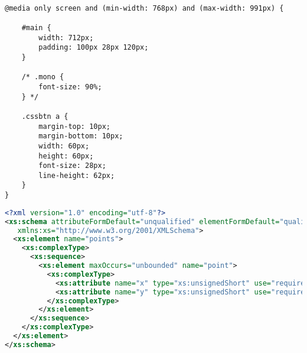 \documentclass[a4paper,15pt]{article}
\begin{document}
\begin{lstlisting}[style=htmlcssjsStyle]

@media only screen and (min-width: 768px) and (max-width: 991px) {
	
	#main {
		width: 712px;
		padding: 100px 28px 120px;
	}
	
	/* .mono {
		font-size: 90%;
	} */
	
	.cssbtn a {
		margin-top: 10px;
		margin-bottom: 10px;
		width: 60px;  
		height: 60px;   
		font-size: 28px;
		line-height: 62px;
	}
}
\end{lstlisting}

\begin{lstlisting}[language=XML]
<?xml version="1.0" encoding="utf-8"?>
<xs:schema attributeFormDefault="unqualified" elementFormDefault="qualified"
   xmlns:xs="http://www.w3.org/2001/XMLSchema">
  <xs:element name="points">
    <xs:complexType>
      <xs:sequence>
        <xs:element maxOccurs="unbounded" name="point">
          <xs:complexType>
            <xs:attribute name="x" type="xs:unsignedShort" use="required" />
            <xs:attribute name="y" type="xs:unsignedShort" use="required" />
          </xs:complexType>
        </xs:element>
      </xs:sequence>
    </xs:complexType>
  </xs:element>
</xs:schema>
\end{lstlisting}
\end{document}
